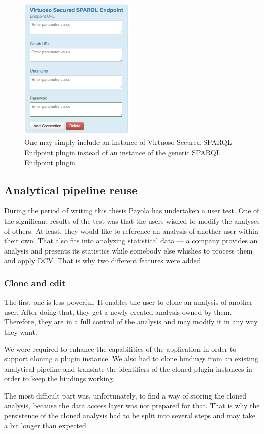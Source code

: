 \begin{figure}
	\centering
	\includegraphics[width=55mm]{img/secured.png}
	\caption{One may simply include an instance of Virtuoso Secured SPARQL Endpoint plugin instead
	of an instance of the generic SPARQL Endpoint plugin.}
	\label{fig:secured-ds}
\end{figure}

\subsection{Analytical pipeline reuse}
During the period of writing this thesis Payola has undertaken a user test. One 
of the significant results of the test was that the users wished to modify the
analyses of others. At least, they would like to reference an analysis of 
another user within their own. That also fits into analyzing statistical data --- 
a company provides an analysis and presents its statistics while somebody else 
whishes to process them and apply DCV. That is why two different features 
were added.

\subsubsection{Clone and edit}
The first one is less powerful. It enables the user to clone an analysis of 
another user. After doing that, they get a newly created analysis owned by 
them. Therefore, they are in a full control of the analysis and may modify it in 
any way they want.

We were required to enhance the capabilities of the application in order to 
support cloning a plugin instance. We also had to clone bindings from an 
existing analytical pipeline and translate the identifiers of the cloned plugin 
instances in order to keep the bindings working.

The most difficult part was, unfortunately, to find a way of storing the cloned 
analysis, because the data access layer was not prepared for that. That is why
the persistence of the cloned analysis had to be split into several steps and may take a 
bit longer than expected.

